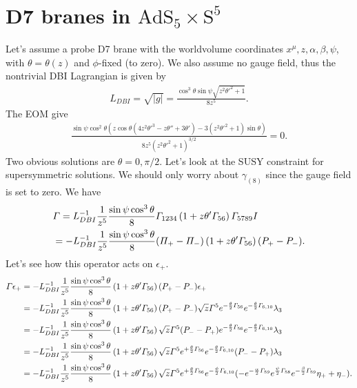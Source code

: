 \documentclass[11pt]{article}
\let\oldGamma=\Gamma
\let\oldPi=\Pi
\renewcommand{\Gamma}{\mathnormal{\oldGamma}}
\renewcommand{\Pi}{\mathnormal{\oldPi}}
\newcommand{\Sphere}{\mathrm{S}}  %
\newcommand{\AdS}{\mathrm{AdS}}
\begin{document}
\section{D7 branes in $\AdS_5\times \Sphere^5$}
Let's assume a probe D7 brane with the worldvolume coordinates $x^\mu,z,\alpha,\beta,\psi$, with $\theta = \theta(z)$ and $\phi$-fixed (to zero).
We also assume no gauge field, thus the nontrivial DBI Lagrangian is given by
\begin{align}
L_{DBI} = \sqrt{|g|} = \frac{\cos ^3 \theta  \sin \psi  \sqrt{z^2 \theta'^2+1}}{8 z^5}.
\end{align}
The EOM give
\begin{align}
\frac{\sin \psi  \cos ^2\theta  \left(z \cos \theta  \left(4 z^2 \theta '^3-z \theta ''+3 \theta '\right)-3 \left(z^2 \theta '^2+1\right) \sin \theta \right)}{8 z^5 \left(z^2 \theta '^2+1\right)^{3/2}} = 0.
\end{align}
Two obvious solutions are $\theta = 0,\pi/2$.
Let's look at the SUSY constraint for supersymmetric solutions.
We should only worry about $\gamma_{(8)}$ since the gauge field is set to zero.
We have
\begin{align}
&\Gamma = L_{DBI}^{-1}\frac{1}{z^5}\frac{\sin\psi\cos^3\theta}{8}\Gamma_{1234}\left(1 + z\theta' \Gamma_{56}\right)\Gamma_{5789}I\nonumber\\
&= -L_{DBI}^{-1}\frac{1}{z^5}\frac{\sin\psi\cos^3\theta}{8}(\Pi_+-\Pi_-)\left(1 + z\theta' \Gamma_{56}\right)(P_+ - P_-).
\end{align}
Let's see how this operator acts on $\epsilon_+$.
\begin{align}
\Gamma \epsilon_+&= -L_{DBI}^{-1}\frac{1}{z^5}\frac{\sin\psi\cos^3\theta}{8}\left(1 + z\theta' \Gamma_{56}\right)(P_+ - P_-)\epsilon_+\nonumber\\
& = -L_{DBI}^{-1}\frac{1}{z^5}\frac{\sin\psi\cos^3\theta}{8}\left(1 + z\theta' \Gamma_{56}\right)(P_+ - P_-)
\sqrt{z}\Gamma^5e^{- \frac{\theta}{2}\Gamma_{56}}e^{- \frac{\theta}{2}\Gamma_{6,10}}\lambda_3\nonumber\\
& = -L_{DBI}^{-1}\frac{1}{z^5}\frac{\sin\psi\cos^3\theta}{8}\left(1 + z\theta' \Gamma_{56}\right)
\sqrt{z}\Gamma^5(P_- - P_+)e^{- \frac{\theta}{2}\Gamma_{56}}e^{- \frac{\theta}{2}\Gamma_{6,10}}\lambda_3\nonumber\\
& = -L_{DBI}^{-1}\frac{1}{z^5}\frac{\sin\psi\cos^3\theta}{8}\left(1 + z\theta' \Gamma_{56}\right)
\sqrt{z}\Gamma^5e^{+\frac{\theta}{2}\Gamma_{56}}e^{- \frac{\theta}{2}\Gamma_{6,10}}(P_- - P_+)\lambda_3\nonumber\\
& = -L_{DBI}^{-1}\frac{1}{z^5}\frac{\sin\psi\cos^3\theta}{8}\left(1 + z\theta' \Gamma_{56}\right)
\sqrt{z}\Gamma^5e^{+ \frac{\theta}{2}\Gamma_{56}}e^{- \frac{\phi}{2}\Gamma_{6,10}}(-e^{-\frac{\alpha}{2}\Gamma_{59}}e^{\frac{\psi}{2}\Gamma_{58}}e^{-\frac{\beta}{2}\Gamma_{59}}\eta_+ + \eta_-).
\end{align}
\end{document}
